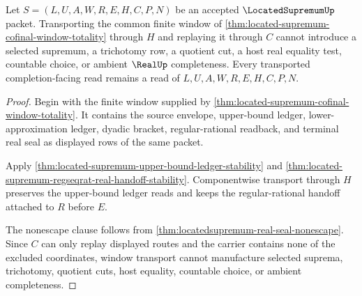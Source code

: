 \begin{theorem}
\label{thm:located-supremum-window-transport}
Let $S=(L,U,A,W,R,E,H,C,P,N)$ be an accepted $\LocatedSupremumUp$ packet. Transporting the common finite window of \autoref{thm:located-supremum-cofinal-window-totality} through $H$ and replaying it through $C$ cannot introduce a selected supremum, a trichotomy row, a quotient cut, a host real equality test, countable choice, or ambient $\RealUp$ completeness. Every transported completion-facing read remains a read of $L,U,A,W,R,E,H,C,P,N$.
\end{theorem}
\begin{proof}
Begin with the finite window supplied by \autoref{thm:located-supremum-cofinal-window-totality}. It contains the source envelope, upper-bound ledger, lower-approximation ledger, dyadic bracket, regular-rational readback, and terminal real seal as displayed rows of the same packet.

Apply \autoref{thm:located-supremum-upper-bound-ledger-stability} and \autoref{thm:located-supremum-regseqrat-real-handoff-stability}. Componentwise transport through $H$ preserves the upper-bound ledger reads and keeps the regular-rational handoff attached to $R$ before $E$.

The nonescape clause follows from \autoref{thm:locatedsupremum-real-seal-nonescape}. Since $C$ can only replay displayed routes and the carrier contains none of the excluded coordinates, window transport cannot manufacture selected suprema, trichotomy, quotient cuts, host equality, countable choice, or ambient completeness.
\end{proof}

